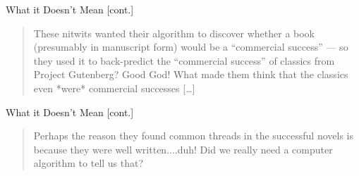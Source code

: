 \documentclass[professionalfonts, xcolor={usenames,svgnames,x11names,table}]{beamer}
\begin{document}
\begin{frame}{What it Doesn't Mean [cont.]}
    \begin{quote}
        These nitwits wanted their algorithm to discover whether a book (presumably in manuscript form) would be a ``commercial success'' --- so they used it to back-predict the ``commercial success'' of classics from Project Gutenberg? Good God!
        What made them think that the classics even *were* commercial successes [\ldots]
    \end{quote}

\end{frame}

\begin{frame}{What it Doesn't Mean [cont.]}
    \begin{quote}
        Perhaps the reason they found common threads in the successful novels is because they were well written....duh! Did we really need a computer algorithm to tell us that?
    \end{quote}

\end{frame}
\end{document}
